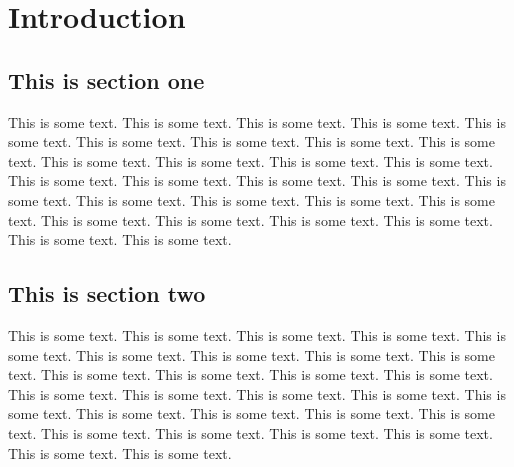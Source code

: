 \chapter*{Introduction}


\section{This is section one}

This is some text. This is some text. This is some text. This is some text. This is some text. This is some text. This is some text. 
This is some text. This is some text. This is some text. This is some text. This is some text. This is some text. This is some text. 
This is some text. This is some text. This is some text. This is some text. This is some text. This is some text. This is some text. 
This is some text. This is some text. This is some text. This is some text. This is some text. This is some text. This is some text. 


\section{This is section two}

This is some text. This is some text. This is some text. This is some text. This is some text. This is some text. This is some text. 
This is some text. This is some text. This is some text. This is some text. This is some text. This is some text. This is some text. 
This is some text. This is some text. This is some text. This is some text. This is some text. This is some text. This is some text. 
This is some text. This is some text. This is some text. This is some text. This is some text. This is some text. This is some text. 
